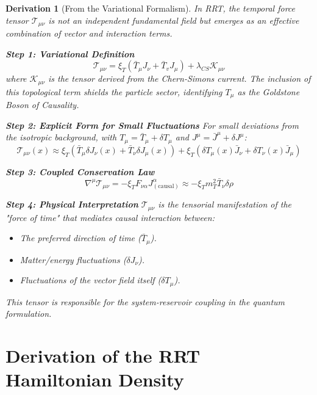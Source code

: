 \documentclass[10pt, a4paper]{article}
\newcommand{\Tmu}{T_{\mu}}      %
\newcommand{\Tmunu}{\mathcal{T}_{\mu\nu}} %
\newcommand{\xiT}{\xi_T}       %
\newtheorem{derivation}{Derivation}
\begin{document}
\begin{derivation}[From the Variational Formalism]
In RRT, the temporal force tensor $\Tmunu$ is not an independent fundamental field but emerges as an effective combination of vector and interaction terms.

\textbf{Step 1: Variational Definition}
\begin{equation}
\mathcal{T}_{\mu\nu} = \xi_T (\bar{T}_ \mu J_\nu + \bar{T}_v J_\mu) + \lambda_{CS} \mathcal{K}_{\mu\nu}
\tag{5.2}
\end{equation}
where $\mathcal{K}_{\mu\nu}$ is the tensor derived from the Chern-Simons current. The inclusion of this topological term shields the particle sector, identifying $T_\mu$ as the Goldstone Boson of Causality.

\textbf{Step 2: Explicit Form for Small Fluctuations}
For small deviations from the isotropic background, with $\Tmu = \bar{T}_\mu + \delta T_\mu$ and $J^\mu = \bar{J}^\mu + \delta J^\mu$:
\begin{equation}
\Tmunu(x) \approx \xiT \left( \bar{T}_\mu \delta J_\nu(x) + \bar{T}_\nu \delta J_\mu(x) \right) + \xiT \left( \delta T_\mu(x) \bar{J}_\nu + \delta T_\nu(x) \bar{J}_\mu \right)
\tag{5.2}
\end{equation}

\textbf{Step 3: Coupled Conservation Law}
\begin{equation}
\nabla^\mu \Tmunu = - \xiT F_{\nu\alpha} J^\alpha_{(\text{causal})} \approx - \xiT m_T^2 \bar{T}_\nu \delta \rho
\tag{5.3}
\end{equation}

\textbf{Step 4: Physical Interpretation}
$\Tmunu$ is the tensorial manifestation of the "force of time" that mediates causal interaction between:
\begin{itemize}
\item The preferred direction of time ($\bar{T}_\mu$).
\item Matter/energy fluctuations ($\delta J_\nu$).
\item Fluctuations of the vector field itself ($\delta T_\mu$).
\end{itemize}
This tensor is responsible for the system-reservoir coupling in the quantum formulation.
\end{derivation}

\section{Derivation of the RRT Hamiltonian Density}
\end{document}
